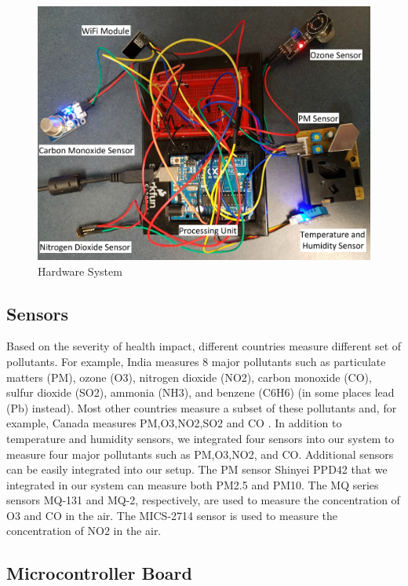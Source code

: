 \documentclass[11pt]{article}
\begin{document}
\begin{figure}[h!]
  \centering
  \hspace*{-1.25cm}   
\includegraphics[scale=0.094]{images/fig4.jpg}
  \hspace*{-1.25cm}
  \caption{Hardware System}
  \label{arch}
\end{figure}



\subsection{Sensors}

Based on the severity of health impact, different countries measure different set of pollutants. For example, India measures 8 major pollutants such as particulate matters (PM), ozone (O3), nitrogen dioxide (NO2), carbon monoxide (CO), sulfur dioxide (SO2), ammonia (NH3), and benzene (C6H6) (in some places lead (Pb) instead). Most other countries measure a subset of these pollutants and, for example, Canada measures PM,O3,NO2,SO2 and CO \cite{HR13}.
 In addition to temperature and humidity sensors, we integrated four sensors into our system to measure four major pollutants such as PM,O3,NO2, and CO. Additional sensors can be easily integrated into our setup. The PM sensor Shinyei PPD42 that we integrated in our system can measure both PM2.5 and PM10. The MQ series sensors MQ-131 and MQ-2, respectively, are used to measure the concentration of O3 and CO in the air. The MICS-2714 sensor is used to measure the concentration of NO2 in the air.


 \subsection{Microcontroller Board}
 
\end{document}

